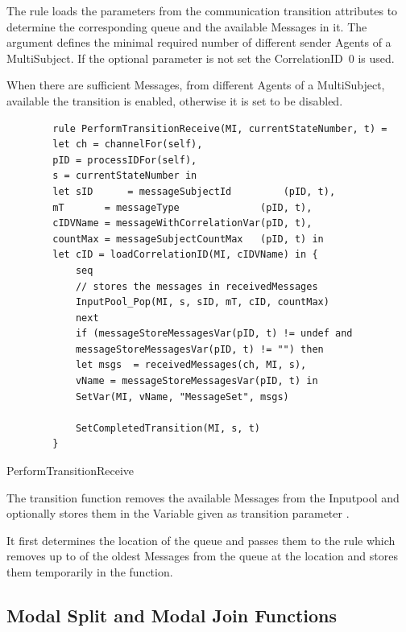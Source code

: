 The  rule loads the parameters from the communication transition attributes
to determine the corresponding queue and the available Messages in it. The
 argument defines the minimal required
number of different sender Agents of a MultiSubject. If the optional
parameter  is not set the
CorrelationID~0 is used.

When there are sufficient Messages, from different Agents of a MultiSubject,
available the transition is enabled, otherwise it is set to be disabled.



\begin{listing}[H]
	\begin{verbatim}
		rule PerformTransitionReceive(MI, currentStateNumber, t) =
		let ch = channelFor(self),
		pID = processIDFor(self),
		s = currentStateNumber in
		let sID      = messageSubjectId         (pID, t),
		mT       = messageType              (pID, t),
		cIDVName = messageWithCorrelationVar(pID, t),
		countMax = messageSubjectCountMax   (pID, t) in
		let cID = loadCorrelationID(MI, cIDVName) in {
			seq
			// stores the messages in receivedMessages
			InputPool_Pop(MI, s, sID, mT, cID, countMax)
			next
			if (messageStoreMessagesVar(pID, t) != undef and
			messageStoreMessagesVar(pID, t) != "") then
			let msgs  = receivedMessages(ch, MI, s),
			vName = messageStoreMessagesVar(pID, t) in
			SetVar(MI, vName, "MessageSet", msgs)
			
			SetCompletedTransition(MI, s, t)
		}
	\end{verbatim}
	\caption{PerformTransitionReceive}
	\label{lst:shortasm:PerformTransitionReceive}
\end{listing}

The transition function removes the available Messages from the Inputpool and
optionally stores them in the Variable given as transition parameter
.

It first determines the location of the queue and passes them to the
 rule which removes up to 
of the oldest Messages from the queue at the location
and stores them temporarily in the  function.


\subsection{Modal Split and Modal Join Functions}


